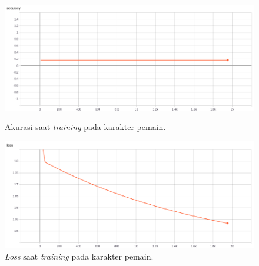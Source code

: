 \begin{figure} [!h] \centering
	\includegraphics[scale=0.43]{img/player_acc_chap4.png}
	\caption{Akurasi saat \textit{training} pada karakter pemain.}
	\label{fig:nn_player_acc_chap4}
	\vspace{4ex}
	
	\includegraphics[scale=0.43]{img/player_loss_chap4.png}
	\caption{\textit{Loss} saat \textit{training} pada karakter pemain.}
	\label{fig:nn_player_loss_chap4}
\end{figure}
\clearpage

